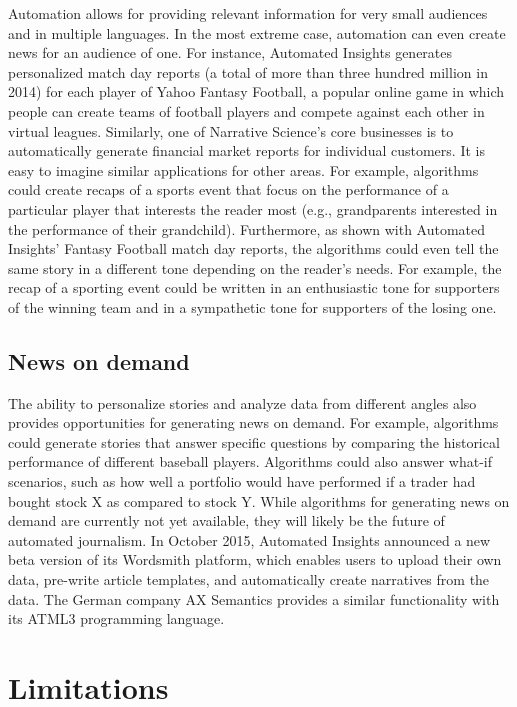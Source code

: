 \documentclass[notoc, symmetric, nobib, nols]{towcenter-book}
\begin{document}
Automation allows for providing relevant information for very small audiences and in multiple languages. In the most extreme case, automation can even create news for an audience of one. For instance, Automated Insights generates personalized match day reports (a total of more than three hundred million in 2014) for each player of Yahoo Fantasy Football, a popular online game in which people can create teams of football players and compete against each other in virtual leagues. Similarly, one of Narrative Science’s core businesses is to automatically generate financial market reports for individual customers. It is easy to imagine similar applications for other areas. For example, algorithms could create recaps of a sports event that focus on the performance of a particular player that interests the reader most (e.g., grandparents interested in the performance of their grandchild). Furthermore, as shown with Automated Insights’ Fantasy Football match day reports, the algorithms could even tell the same story in a different tone depending on the reader’s needs. For example, the recap of a sporting event could be written in an enthusiastic tone for supporters of the winning team and in a sympathetic tone for supporters of the losing one.

\subsection{News on demand}

The ability to personalize stories and analyze data from different angles also provides opportunities for generating news on demand. For example, algorithms could generate stories that answer specific questions by comparing the historical performance of different baseball players. Algorithms could also answer what-if scenarios, such as how well a portfolio would have performed if a trader had bought stock X as compared to stock Y. While algorithms for generating news on demand are currently not yet available, they will likely be the future of automated journalism. In October 2015, Automated Insights announced a new beta version of its Wordsmith platform, which enables users to upload their own data, pre-write article templates, and automatically create narratives from the data.\cite{kot15} The German company AX Semantics provides a similar functionality with its ATML3 programming language.

\section{Limitations} 
\end{document}
